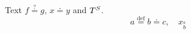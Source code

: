 \documentclass{article}
\begin{document}
Text $f \stackrel{?}{=} g$, $x\doteq y$ and $\mathchoice{D}{T}{S}{SS}^{\mathchoice{D}{T}{S}{SS}}$.
\[ a \stackrel{\mathrm{def}}{=} b \doteq c, \quad x_{\stackrel{a}{b}} \]
\end{document}
